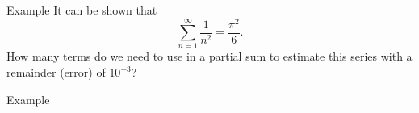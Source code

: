 \documentclass[presentation]{beamer}
\begin{document}
\begin{frame}[label={sec:org37eeacb}]{Example}
It can be shown that
\[
\sum\limits_{n=1}^{\infty} \frac{1}{n^2} = \frac{\pi^2}{6}.\]
How many terms do we need to use in a partial sum to estimate this series
with a remainder (error) of \(10^{-3}\)?
\vspace{10in}
\end{frame}

\begin{frame}[label={sec:org07a6541}]{Example}
\end{frame}
\end{document}
